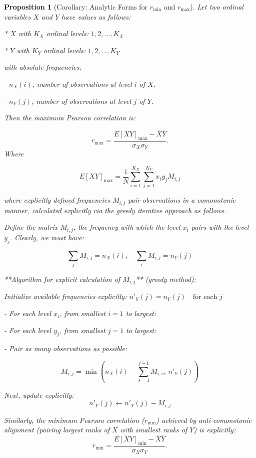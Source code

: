 \documentclass[
  12pt,
]{article}
\newtheorem{proposition}{Proposition}
\begin{document}
\begin{proposition}[Corollary: Analytic Forms for $r_{\min}$ and $r_{\max}$]


Let two ordinal variables $X$ and $Y$ have values as follows:

* $X$ with $K_X$ ordinal levels: $1,2,\dots,K_X$
    
* $Y$ with $K_Y$ ordinal levels: $1,2,\dots,K_Y$
    

with absolute frequencies:

- $n_{X}(i)$, number of observations at level $i$ of $X$.
    
- $n_{Y}(j)$, number of observations at level $j$ of $Y$.
    

Then the maximum Pearson correlation is:

$$r_{\text{max}} = \frac{E[XY]_{\text{max}} - \bar{X}\bar{Y}}{\sigma_X \sigma_Y}.$$
Where 

$$
E[XY]_{\max} =\frac{1}{N}\sum_{i=1}^{K_X}\sum_{j=1}^{K_Y}x_i y_j M_{i,j}
$$

where explicitly defined frequencies $M_{i,j}$ pair observations in a comonotonic manner, calculated explicitly via the greedy iterative approach as follows.  

Define the matrix $M_{i,j}$, the frequency with which the level $x_i$ pairs with the level $y_j$. Clearly, we must have:

$$\sum_j M_{i,j}=n_X(i),\quad\sum_i M_{i,j}=n_Y(j)$$

**Algorithm for explicit calculation of $M_{i,j}$** (greedy method):

\begin{algorithm}

Initialize available frequencies explicitly:  $n'_Y(j)=n_Y(j)\quad\text{for each }j$

- For each level $x_i$, from smallest $i=1$ to largest:
    
    - For each level $y_j$, from smallest $j=1$ to largest:
        
        - Pair as many observations as possible:
            

$$M_{i,j}=\min\left(n_X(i)-\sum_{s=1}^{j-1}M_{i,s},\, n'_Y(j)\right)$$

Next, update explicitly: $$n'_Y(j)\leftarrow n'_Y(j)-M_{i,j}$$

\end{algorithm}


Similarly, the minimum Pearson correlation ($r_{\text{min}}$) achieved by anti-comonotonic alignment (pairing largest ranks of $X$ with smallest ranks of $Y$) is explicitly:
$$r_{\text{min}} = \frac{E[XY]_{\text{min}} - \bar{X}\bar{Y}}{\sigma_X \sigma_Y}.$$



\end{proposition}
\end{document}
